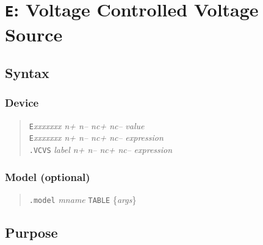 %
%
%
%
\section{{\tt E}: Voltage Controlled Voltage Source}
\subsection{Syntax}
\subsubsection{Device}
\begin{verse}
{\tt E}{\it xxxxxxx n+ n-- nc+ nc--} {\it value}\\
{\tt E}{\it xxxxxxx n+ n-- nc+ nc--} {\it expression}\\
{\tt .VCVS} {\it label n+ n-- nc+ nc--} {\it expression}
\end{verse}
\subsubsection{Model (optional)}
\begin{verse}
{\tt .model} {\it mname} {\tt TABLE} \{{\it args}\}
\end{verse}
\subsection{Purpose}

